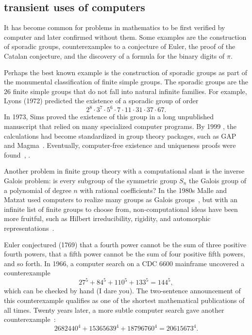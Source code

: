 \documentclass{llncs}
\begin{document}
\subsection{transient uses of computers}

It has become common for problems in mathematics to be first verified by
computer and later confirmed without them.  Some examples are
the construction of sporadic groups, counterexamples to a conjecture
of Euler, the proof of the Catalan conjecture, and the discovery of a formula
for the binary digits of $\pi$.

Perhaps the best known example is the construction of sporadic groups as
part of the monumental classification of finite simple groups.  The
sporadic groups are the $26$ finite simple groups that do not fall into
natural infinite families.  For example,  Lyons (1972) predicted
the existence of a sporadic group of order
\[
2^ 8\cdot 3^7\cdot 5^6\cdot  7\cdot 11 \cdot 31 \cdot 37 \cdot 67.
\]
In 1973, Sims proved the existence of this group in a long unpublished
manuscript that relied on many specialized computer programs.  By 1999
, the calculations had become standardized in group theory packages,
such as GAP and Magma~\cite{HS99}.  Eventually, computer-free
existence and uniqueness proofs were found~\cite{MParker},
\cite{AS92}.


Another problem in finite group theory with a computational slant is
the inverse Galois problem: is every subgroup of the symmetric group
$S_n$ the Galois group of a polynomial of degree $n$ with rational
coefficients?  In the 1980s Malle and Matzat used computers to realize
many groups as Galois groups~\cite{MM}, but with an infinite list of
finite groups to choose from, non-computational ideas have been more
fruitful, such as Hilbert irreducibility, rigidity, and automorphic
representations~\cite{KLS}.

\smallskip

Euler conjectured (1769) that a fourth power cannot be the sum of
three positive fourth powers, that a fifth power cannot be the sum of
four positive fifth powers, and so forth.  In 1966, a computer search
\cite{LP66} on a CDC 6600 mainframe uncovered a counterexample
\[
27^5 + 84^5 + 110^5 + 133^5 = 144^5,
\]
which can be checked by hand (I dare you).  The two-sentence
announcement of this counterexample qualifies as one of the shortest
mathematical publications of all times.  Twenty years later, a more
subtle computer search gave another counterexample~\cite{Elkies88}:
\[
2682440^4 + 15365639^4 + 18796760^4 = 20615673^4.
\]
\end{document}
